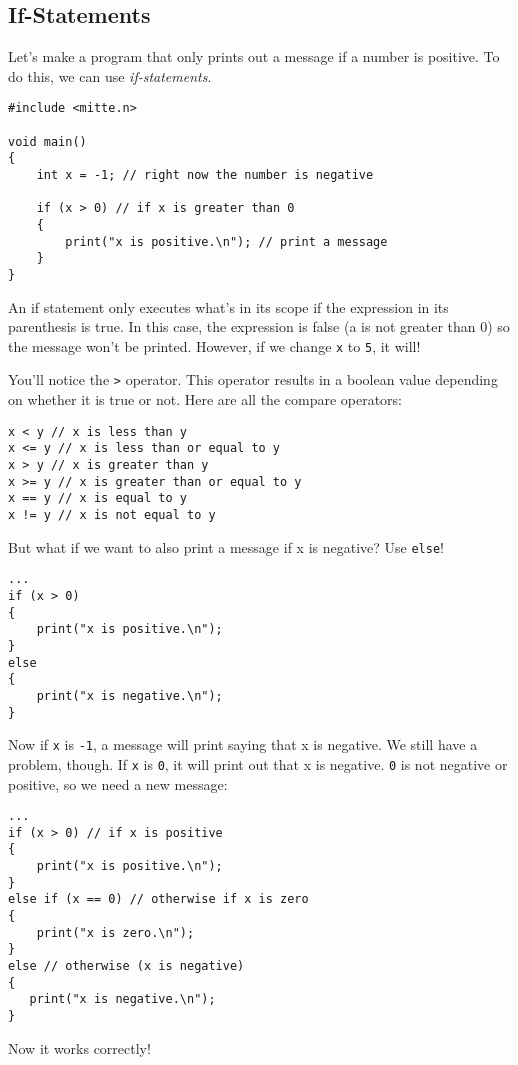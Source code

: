 \documentclass[10pt,a4paper]{article}
\begin{document}
\subsection{If-Statements}
Let's make a program that only prints out a message if a number is positive. To do this, we can use \textit{if-statements}.
\begin{verbatim}
#include <mitte.n>

void main()
{
    int x = -1; // right now the number is negative
    
    if (x > 0) // if x is greater than 0
    {
        print("x is positive.\n"); // print a message
    }
}
\end{verbatim}

An if statement only executes what's in its scope if the expression in its parenthesis is true. In this case, the expression is false (a is not greater than 0) so the message won't be printed. However, if we change \verb|x| to \verb|5|, it will!

You'll notice the \verb|>| operator. This operator results in a boolean value depending on whether it is true or not. Here are all the compare operators:
\begin{verbatim}
x < y // x is less than y
x <= y // x is less than or equal to y
x > y // x is greater than y
x >= y // x is greater than or equal to y
x == y // x is equal to y
x != y // x is not equal to y
\end{verbatim}

But what if we want to also print a message if x is negative? Use \verb|else|!
\begin{verbatim}
...
if (x > 0)
{
    print("x is positive.\n");
}
else
{
    print("x is negative.\n");
}
\end{verbatim}

Now if \verb|x| is \verb|-1|, a message will print saying that x is negative. We still have a problem, though. If \verb|x| is \verb|0|, it will print out that x is negative. \verb|0| is not negative or positive, so we need a new message:
\begin{verbatim}
...
if (x > 0) // if x is positive
{
    print("x is positive.\n");
}
else if (x == 0) // otherwise if x is zero
{
    print("x is zero.\n");
}
else // otherwise (x is negative)
{
   print("x is negative.\n");
}
\end{verbatim}

Now it works correctly!

\newpage
\end{document}
